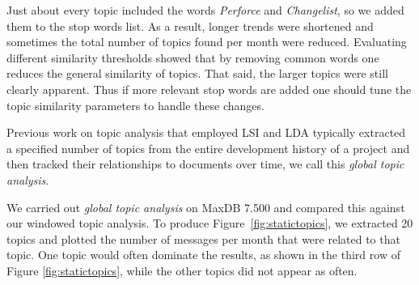 \documentclass[times, 10pt,twocolumn]{article}
\newcommand{\shrinkit}{\vspace*{-.3em}}
\begin{document}
Just about every topic included the words \emph{Perforce} and
\emph{Changelist}, so we added them to the stop words list. As a
result, longer trends were shortened and sometimes the total number of
topics found per month were reduced.  Evaluating different similarity
thresholds showed that by removing common words one reduces the
general similarity of topics. That said, the larger topics were still
clearly apparent. Thus if more relevant stop words are added one
should tune the topic similarity parameters to handle these changes.





\shrinkit
{}
\shrinkit






Previous work on topic analysis that employed LSI and LDA typically
extracted a specified number of topics from the entire development
history of a project and then tracked their relationships to documents
over time, we call this \emph{global topic analysis}.


We carried out \emph{global topic analysis} on MaxDB 7.500 and
compared this against our windowed topic analysis.  To produce
Figure~\ref{fig:statictopics}, we extracted 20 topics and plotted the
number of messages per month that were related to that topic.  One
topic would often dominate the results, as shown in the third row of
Figure \ref{fig:statictopics}, while the other topics did not appear
as often.
\end{document}
